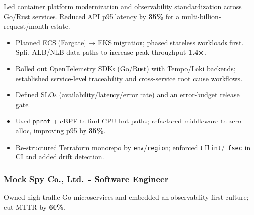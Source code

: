 \documentclass[
  10pt,
  a4paper,
]{extarticle}
\providecommand{\tightlist}{%
  \setlength{\itemsep}{0pt}\setlength{\parskip}{0pt}}
\begin{document}
Led container platform modernization and observability standardization
across Go/Rust services. Reduced API p95 latency by \textbf{35\%} for a
multi-billion-request/month estate.

\begin{itemize}
\tightlist
\item
  Planned ECS (Fargate) → EKS migration; phased stateless workloads
  first. Split ALB/NLB data paths to increase peak throughput
  \textbf{1.4×}.
\item
  Rolled out OpenTelemetry SDKs (Go/Rust) with Tempo/Loki backends;
  established service-level traceability and cross-service root cause
  workflows.
\item
  Defined SLOs (availability/latency/error rate) and an error-budget
  release gate.
\item
  Used \texttt{pprof} + eBPF to find CPU hot paths; refactored
  middleware to zero-alloc, improving p95 by \textbf{35\%}.
\item
  Re-structured Terraform monorepo by \texttt{env}/\texttt{region};
  enforced \texttt{tflint}/\texttt{tfsec} in CI and added drift
  detection.
\end{itemize}

\newpage

\subsubsection{Mock Spy Co., Ltd.~- Software
Engineer}\label{mock-spy-co.-ltd.---software-engineer}

%
  {\selectfont
  \noindent\makebox[\linewidth]{%
    \textcolor{black}{Permanent}\hfill
  }}\par{}

%
  {\selectfont
  \noindent{}}\par{}

Owned high-traffic Go microservices and embedded an observability-first
culture; cut MTTR by \textbf{60\%}.
\end{document}
